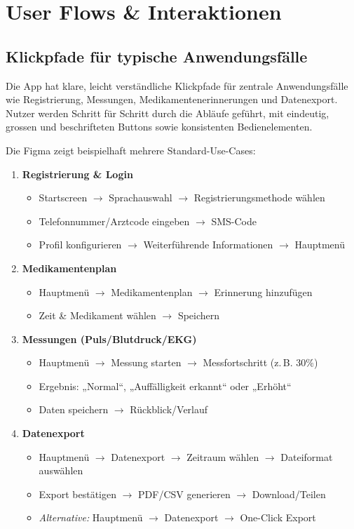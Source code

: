 \section{User Flows \& Interaktionen}
\subsection{Klickpfade für typische Anwendungsfälle}
Die App hat klare, leicht verständliche Klickpfade für zentrale Anwendungsfälle wie Registrierung, Messungen, Medikamentenerinnerungen und Datenexport. Nutzer werden Schritt für Schritt durch die Abläufe geführt, mit eindeutig, grossen und beschrifteten Buttons sowie konsistenten Bedienelementen.

Die Figma zeigt beispielhaft mehrere Standard-Use-Cases:

\begin{enumerate}
	\item \textbf{Registrierung \& Login}
	\begin{itemize}
		\item Startscreen $\rightarrow$ Sprachauswahl $\rightarrow$ Registrierungsmethode wählen
		\item Telefonnummer/Arztcode eingeben $\rightarrow$ SMS-Code
		\item Profil konfigurieren $\rightarrow$ Weiterführende Informationen $\rightarrow$ Hauptmenü
	\end{itemize}
	
	\item \textbf{Medikamentenplan}
	\begin{itemize}
		\item Hauptmenü $\rightarrow$ Medikamentenplan $\rightarrow$ Erinnerung hinzufügen
		\item Zeit \& Medikament wählen $\rightarrow$ Speichern
	\end{itemize}
	
	\item \textbf{Messungen (Puls/Blutdruck/EKG)}
	\begin{itemize}
		\item Hauptmenü $\rightarrow$ Messung starten $\rightarrow$ Messfortschritt (z.\,B. 30\%)
		\item Ergebnis: „Normal“, „Auffälligkeit erkannt“ oder „Erhöht“
		\item Daten speichern $\rightarrow$ Rückblick/Verlauf
	\end{itemize}
	
	\item \textbf{Datenexport}
	\begin{itemize}
		\item Hauptmenü $\rightarrow$ Datenexport $\rightarrow$ Zeitraum wählen $\rightarrow$ Dateiformat auswählen
		\item Export bestätigen $\rightarrow$ PDF/CSV generieren $\rightarrow$ Download/Teilen
		\item \emph{Alternative:} Hauptmenü $\rightarrow$ Datenexport $\rightarrow$ One-Click Export
	\end{itemize}
	

\end{enumerate}
